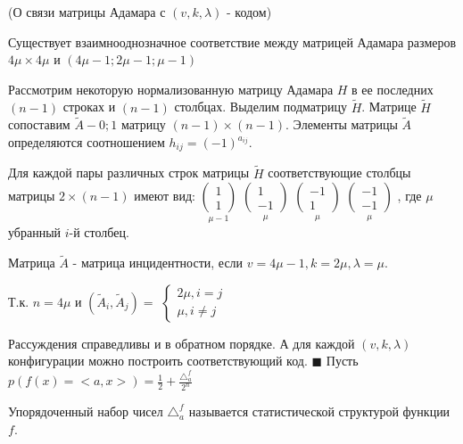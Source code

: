 \thr (О связи матрицы Адамара с $(v, k, \lambda)$ - кодом)

Существует взаимнооднозначное соответствие между матрицей Адамара размеров $4\mu \times 4\mu$
и $(4\mu - 1; 2\mu - 1; \mu - 1)$

\proof
Рассмотрим некоторую нормализованную матрицу Адамара $H$ в ее последних $(n - 1)$ строках
и $(n - 1)$ столбцах. Выделим подматрицу $\tilde{H}$. Матрице $\tilde{H}$ сопоставим $\tilde{A} - 0;1$
матрицу $(n - 1)\times (n - 1)$. Элементы  матрицы $\tilde{A}$ определяются соотношением
$h_{ij} = (-1)^{a_{ij}}$.

Для каждой пары различных строк матрицы $\tilde{H}$ соответствующие столбцы матрицы $2\times (n - 1)$
имеют вид: 
$\underset{
\mu - 1
}{
\begin{pmatrix}
	1 \\
	1
\end{pmatrix}	
}$
$\underset{
\mu
}{
\begin{pmatrix}
	1 \\
	-1
\end{pmatrix}	
}$
$\underset{
\mu
}{
\begin{pmatrix}
	-1 \\
	1
\end{pmatrix}	
}$
$\underset{
\mu
}{
\begin{pmatrix}
	-1 \\
	-1
\end{pmatrix}	
}$
, где $\mu$ убранный $i$-й столбец.

Матрица $\tilde{A}$ - матрица инцидентности, если $v = 4\mu - 1, k = 2\mu, \lambda = \mu$.

Т.к. $n = 4\mu$ и $(\tilde{A}_i, \tilde{A}_j) = $
$\begin{cases}
	2\mu, i = j \\
	\mu, i\neq j
\end{cases}$

Рассуждения справедливы и в обратном порядке. А для каждой $(v, k, \lambda)$ конфигурации
можно построить соответствующий код. $\blacksquare$
\newpage
Пусть $p(f(x) = <a, x>) = \frac{1}{2} + \frac{\triangle_a^f}{2^n}$

\opr
Упорядоченный набор чисел $\triangle_a^f$ называется статистической структурой функции $f$.

